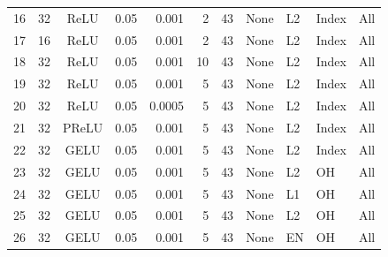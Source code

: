 \documentclass[11pt,letterpaper]{article}
\begin{document}
\begin{minipage}{\textwidth}
\begin{tabular*}{\textwidth}{@{\extracolsep{\fill}}rlcrrrrllll@{}}
16 & 32 & ReLU & 0.05 & 0.001 & 2 & 43 & None & L2 & Index & All \\
17 & 16 & ReLU & 0.05 & 0.001 & 2 & 43 & None & L2 & Index & All \\
18 & 32 & ReLU & 0.05 & 0.001 & 10 & 43 & None & L2 & Index & All \\
19 & 32 & ReLU & 0.05 & 0.001 & 5 & 43 & None & L2 & Index & All \\
20 & 32 & ReLU & 0.05 & 0.0005 & 5 & 43 & None & L2 & Index & All \\
21 & 32 & PReLU & 0.05 & 0.001 & 5 & 43 & None & L2 & Index & All \\
22 & 32 & GELU & 0.05 & 0.001 & 5 & 43 & None & L2 & Index & All \\
23 & 32 & GELU & 0.05 & 0.001 & 5 & 43 & None & L2 & OH & All \\
24 & 32 & GELU & 0.05 & 0.001 & 5 & 43 & None & L1 & OH & All \\
25 & 32 & GELU & 0.05 & 0.001 & 5 & 43 & None & L2 & OH & All \\
26 & 32 & GELU & 0.05 & 0.001 & 5 & 43 & None & EN & OH & All \\
\bottomrule
\end{tabular*}
\end{minipage}\par\medskip
\end{document}
